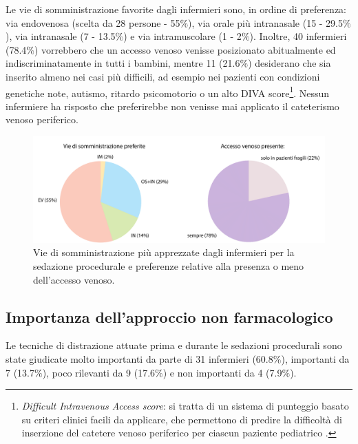 Le vie di somministrazione favorite dagli infermieri sono, in ordine di preferenza: via endovenosa (scelta da 28 persone - 55$\%$), via orale più intranasale (15 - 29.5$\%$), via intranasale (7 - 13.5$\%$) e via intramuscolare (1 - 2$\%$). Inoltre, 40 infermieri (78.4$\%$) vorrebbero che un accesso venoso venisse posizionato abitualmente ed indiscriminatamente in tutti i bambini, mentre 11 (21.6$\%$) desiderano che sia inserito almeno nei casi più difficili, ad esempio nei pazienti con condizioni genetiche note, autismo, ritardo psicomotorio o un alto DIVA score\footnote{\emph{Difficult Intravenous Access score}: si tratta di un sistema di punteggio basato su criteri clinici facili da applicare, che permettono di predire la difficoltà di inserzione del catetere venoso periferico per ciascun paziente pediatrico \cite{Yen2008}.}. Nessun infermiere ha risposto che preferirebbe non venisse mai applicato il cateterismo venoso periferico. 

\begin{figure}[!h]
    \centering
    \includegraphics[width=1\textwidth]{Figure/sommicrosoftchiaro.pdf}
    \caption{Vie di somministrazione più apprezzate dagli infermieri per la sedazione procedurale e preferenze relative alla presenza o meno dell'accesso venoso.}
    \label{fig:viedisomm}
\end{figure}


\subsection*{Importanza dell'approccio non farmacologico}

Le tecniche di distrazione attuate prima e durante le sedazioni procedurali sono state giudicate molto importanti da parte di 31 infermieri (60.8$\%$), importanti da 7 (13.7$\%$), poco rilevanti da 9 (17.6$\%$) e non importanti da 4 (7.9$\%$).

